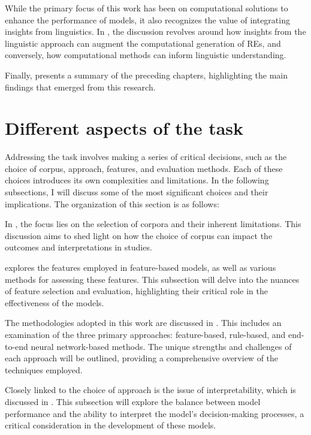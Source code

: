 While the primary focus of this work has been on computational solutions to enhance the performance of \context models, it also recognizes the value of integrating insights from linguistics. In , the discussion revolves around how insights from the linguistic approach can augment the computational generation of REs, and conversely, how computational methods can inform linguistic understanding.

Finally,  presents a summary of the preceding chapters, highlighting the main findings that emerged from this research.


\section{Different aspects of the \context task}\label{sec:diffaspects}

Addressing the \context task involves making a series of critical decisions, such as the choice of corpus, approach, features, and evaluation methods. Each of these choices introduces its own complexities and limitations. In the following subsections, I will discuss some of the most significant choices and their implications. The organization of this section is as follows:

In , the focus lies on the selection of corpora and their inherent limitations. This discussion aims to shed light on how the choice of corpus can impact the outcomes and interpretations in \context studies.

 explores the features employed in feature-based \context models, as well as various methods for assessing these features. This subsection will delve into the nuances of feature selection and evaluation, highlighting their critical role in the effectiveness of the models.

The methodologies adopted in this work are discussed in . This includes an examination of the three primary \context approaches: feature-based, rule-based, and end-to-end neural network-based methods. The unique strengths and challenges of each approach will be outlined, providing a comprehensive overview of the techniques employed.

Closely linked to the choice of approach is the issue of interpretability, which is discussed in . This subsection will explore the balance between model performance and the ability to interpret the model’s decision-making processes, a critical consideration in the development of these models.

